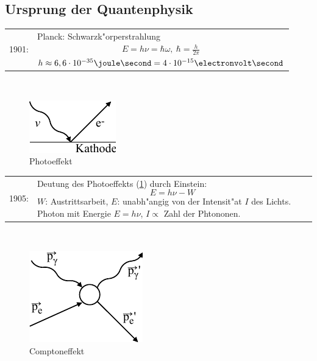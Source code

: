 \documentclass[a4paper]{scrartcl}
\begin{document}
\subsection{Ursprung der Quantenphysik}



\begin{tabular}{l p{400pt}}
1901:	& 
Planck: Schwarzk"orperstrahlung 
  \begin{align}
  E = h \nu = \hbar \omega, \  \hbar = \frac{h}{2 \pi}
  \end{align}
  $h \approx 6,6 \cdot 	10^{-35} \joule \second= 4 \cdot 10^{-15} \electronvolt \second$
\end{tabular}
\\

\begin{figure}[h]
\centering
\includegraphics{001Photoeffekt} 
\caption{Photoeffekt}
\label{Photoeffekt1}
\end{figure}

\begin{tabular}{l p{400pt}}
1905: &
Deutung des Photoeffekts (\ref{Photoeffekt1}) durch Einstein: 
$$E = h\nu - W$$
$W$: Austrittsarbeit, $E$: unabh"angig von der Intensit"at $I$ des Lichts. Photon mit Energie $E = h \nu$, $I \propto $ Zahl der Phtononen.
\end{tabular}
\\

\begin{figure}[h]
\centering
\includegraphics{002Comptoneffekt} 
\caption{Comptoneffekt}
\label{Comptoneffekt1}
\end{figure}
\end{document}
